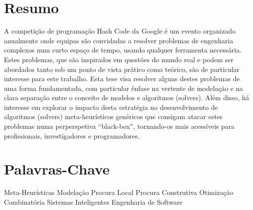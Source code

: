 \thispagestyle{plain}

\section*{Resumo}
\label{sec:resumo}

A competição de programação Hash Code da Google é um evento organizado anualmente
onde equipas são convidadas a resolver problemas de engenharia complexos
num curto espaço de tempo, usando qualquer ferramenta necessária.
Estes problemas, que são inspirados em questões do mundo real e podem ser abordados
tanto sob um ponto de vista prático como teórico, são de particular interesse
para este trabalho. Esta tese visa resolver alguns destes problemas de uma forma
fundamentada, com particular ênfase na vertente de modelação e na clara separação
entre o conceito de modelos e algoritmos (solvers). Além disso, há interesse em
explorar o impacto desta estratégia no desenvolvimento de algoritmos (solvers)
meta-heurísticos genéricos que consigam atacar estes problemas numa
perperspetiva ``black-box'', tornando-os mais acessíveis para profissionais,
investigadores e programadores.

\section*{Palavras-Chave}
\label{sec:palavras-chave}

Meta-Heurísticas \textbullet{}
Modelação \textbullet{}
Procura Local \textbullet{}
Procura Construtiva \textbullet{}
Otimização Combinatória \textbullet{}
Sistemas Inteligentes \textbullet{}
Engenharia de Software
